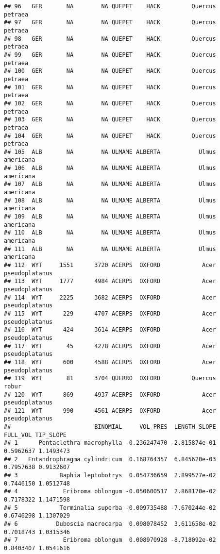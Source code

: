 \documentclass[]{article}
\begin{document}
\begin{verbatim}
## 96   GER       NA        NA QUEPET    HACK         Quercus        petraea
## 97   GER       NA        NA QUEPET    HACK         Quercus        petraea
## 98   GER       NA        NA QUEPET    HACK         Quercus        petraea
## 99   GER       NA        NA QUEPET    HACK         Quercus        petraea
## 100  GER       NA        NA QUEPET    HACK         Quercus        petraea
## 101  GER       NA        NA QUEPET    HACK         Quercus        petraea
## 102  GER       NA        NA QUEPET    HACK         Quercus        petraea
## 103  GER       NA        NA QUEPET    HACK         Quercus        petraea
## 104  GER       NA        NA QUEPET    HACK         Quercus        petraea
## 105  ALB       NA        NA ULMAME ALBERTA           Ulmus      americana
## 106  ALB       NA        NA ULMAME ALBERTA           Ulmus      americana
## 107  ALB       NA        NA ULMAME ALBERTA           Ulmus      americana
## 108  ALB       NA        NA ULMAME ALBERTA           Ulmus      americana
## 109  ALB       NA        NA ULMAME ALBERTA           Ulmus      americana
## 110  ALB       NA        NA ULMAME ALBERTA           Ulmus      americana
## 111  ALB       NA        NA ULMAME ALBERTA           Ulmus      americana
## 112  WYT     1551      3720 ACERPS  OXFORD            Acer pseudoplatanus
## 113  WYT     1777      4984 ACERPS  OXFORD            Acer pseudoplatanus
## 114  WYT     2225      3682 ACERPS  OXFORD            Acer pseudoplatanus
## 115  WYT      229      4707 ACERPS  OXFORD            Acer pseudoplatanus
## 116  WYT      424      3614 ACERPS  OXFORD            Acer pseudoplatanus
## 117  WYT       45      4278 ACERPS  OXFORD            Acer pseudoplatanus
## 118  WYT      600      4588 ACERPS  OXFORD            Acer pseudoplatanus
## 119  WYT       81      3704 QUERRO  OXFORD         Quercus          robur
## 120  WYT      869      4937 ACERPS  OXFORD            Acer pseudoplatanus
## 121  WYT      990      4561 ACERPS  OXFORD            Acer pseudoplatanus
##                        BINOMIAL     VOL_PRES  LENGTH_SLOPE  FULL_VOL TIP_SLOPE
## 1      Pentaclethra macrophylla -0.236247470 -2.815874e-01 0.5962637 1.1493473
## 2   Entandrophragma cylindricum  0.168764357  6.845620e-03 0.7957638 0.9132607
## 3            Baphia leptobotrys  0.054736659  2.899577e-02 0.7446150 1.0512748
## 4             Eribroma oblongum -0.050600517  2.868170e-02 0.7178322 1.1471598
## 5            Terminalia superba -0.009735488 -7.670244e-02 0.6746298 1.1307029
## 6           Duboscia macrocarpa  0.098078452  3.611658e-02 0.7018743 1.0315346
## 7             Eribroma oblongum  0.008970928 -8.718092e-02 0.8403407 1.0541616

\end{verbatim}
\end{document}
